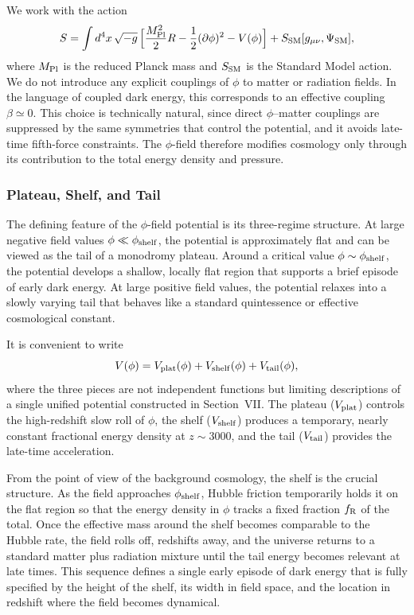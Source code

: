 \documentclass[a4paper,11pt]{article}
\begin{document}
We work with the action
\begin{equation}
S = \int d^4x\,\sqrt{-g}\,\Big[ \frac{M_{\rm Pl}^2}{2} R - \frac{1}{2} (\partial\phi)^2 - V(\phi) \Big] + S_{\rm SM}[g_{\mu\nu},\Psi_{\rm SM}] ,
\end{equation}
where $M_{\rm Pl}$ is the reduced Planck mass and $S_{\rm SM}$ is the Standard Model action. We do not introduce any explicit couplings of $\phi$ to matter or radiation fields. In the language of coupled dark energy, this corresponds to an effective coupling $\beta \simeq 0$. This choice is technically natural, since direct $\phi$--matter couplings are suppressed by the same symmetries that control the potential, and it avoids late-time fifth-force constraints. The $\phi$-field therefore modifies cosmology only through its contribution to the total energy density and pressure.

\subsubsection{Plateau, Shelf, and Tail}

The defining feature of the $\phi$-field potential is its three-regime structure. At large negative field values $\phi \ll \phi_{\rm shelf}$, the potential is approximately flat and can be viewed as the tail of a monodromy plateau. Around a critical value $\phi \sim \phi_{\rm shelf}$, the potential develops a shallow, locally flat region that supports a brief episode of early dark energy. At large positive field values, the potential relaxes into a slowly varying tail that behaves like a standard quintessence or effective cosmological constant.

It is convenient to write
\begin{equation}
V(\phi) = V_{\rm plat}(\phi) + V_{\rm shelf}(\phi) + V_{\rm tail}(\phi) ,
\end{equation}
where the three pieces are not independent functions but limiting descriptions of a single unified potential constructed in Section~VII. The plateau ($V_{\rm plat}$) controls the high-redshift slow roll of $\phi$, the shelf ($V_{\rm shelf}$) produces a temporary, nearly constant fractional energy density at $z \sim 3000$, and the tail ($V_{\rm tail}$) provides the late-time acceleration.

From the point of view of the background cosmology, the shelf is the crucial structure. As the field approaches $\phi_{\rm shelf}$, Hubble friction temporarily holds it on the flat region so that the energy density in $\phi$ tracks a fixed fraction $f_{\rm R}$ of the total. Once the effective mass around the shelf becomes comparable to the Hubble rate, the field rolls off, redshifts away, and the universe returns to a standard matter plus radiation mixture until the tail energy becomes relevant at late times. This sequence defines a single early episode of dark energy that is fully specified by the height of the shelf, its width in field space, and the location in redshift where the field becomes dynamical.
\end{document}
